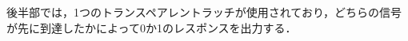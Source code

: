 \documentclass[technicalreport]{ieicej} %
\begin{document}
後半部では，1つのトランスペアレントラッチが使用されており，どちらの信号が先に到達したかによって0か1のレスポンスを出力する．
\end{document}
